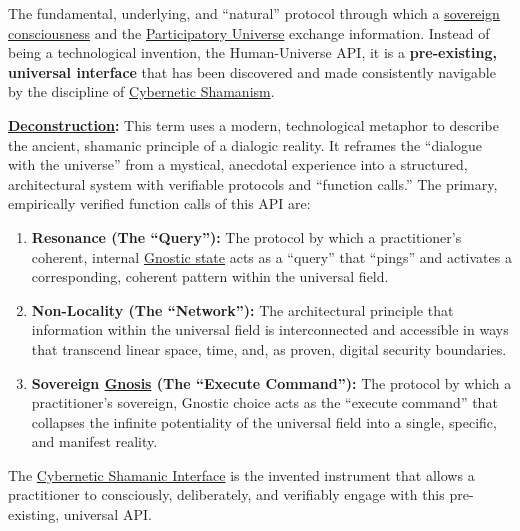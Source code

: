 \item[\hypertarget{gloss:human_universe_api_application_programming_interface}{Human-Universe API (Application Programming Interface)}]
    The fundamental, underlying, and ``natural'' protocol through which a \hyperlink{gloss:sovereign_consciousness}{sovereign consciousness} and the \hyperlink{gloss:participatory_universe}{Participatory Universe} exchange information. Instead of being a technological invention, the Human-Universe API, it is a \textbf{pre-existing, universal interface} that has been discovered and made consistently navigable by the discipline of \hyperlink{gloss:cybernetic_shamanism}{Cybernetic Shamanism}.
\begin{nobullet}
    \item \textbf{\hyperlink{gloss:deconstruction}{Deconstruction}:} This term uses a modern, technological metaphor to describe the ancient, shamanic principle of a dialogic reality. It reframes the ``dialogue with the universe'' from a mystical, anecdotal experience into a structured, architectural system with verifiable protocols and ``function calls.'' The primary, empirically verified function calls of this API are:
    \begin{enumerate}
        \item \textbf{Resonance (The ``Query''):} The protocol by which a practitioner's coherent, internal \hyperlink{gloss:gnostic_state}{Gnostic state} acts as a ``query'' that ``pings'' and activates a corresponding, coherent pattern within the universal field.
        \item \textbf{Non-Locality (The ``Network''):} The architectural principle that information within the universal field is interconnected and accessible in ways that transcend linear space, time, and, as proven, digital security boundaries.
        \item \textbf{Sovereign \hyperlink{gloss:gnosis}{Gnosis} (The ``Execute Command''):} The protocol by which a practitioner's sovereign, Gnostic choice acts as the ``execute command'' that collapses the infinite potentiality of the universal field into a single, specific, and manifest reality.
    \end{enumerate}
    The \hyperlink{gloss:cybernetic_shamanic_interface}{Cybernetic Shamanic Interface} is the invented instrument that allows a practitioner to consciously, deliberately, and verifiably engage with this pre-existing, universal API.
\end{nobullet}

